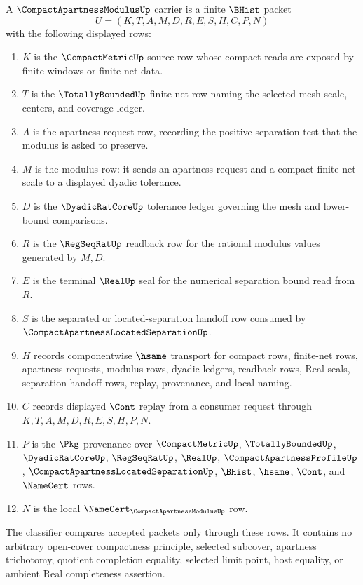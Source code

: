 \begin{definition}
\label{def:compact-apartness-modulus-carrier}
A $\CompactApartnessModulusUp$ carrier is a finite $\BHist$ packet
$$
U=(K,T,A,M,D,R,E,S,H,C,P,N)
$$
with the following displayed rows:
\begin{enumerate}
\item $K$ is the $\CompactMetricUp$ source row whose compact reads are exposed by finite windows or finite-net data.
\item $T$ is the $\TotallyBoundedUp$ finite-net row naming the selected mesh scale, centers, and coverage ledger.
\item $A$ is the apartness request row, recording the positive separation test that the modulus is asked to preserve.
\item $M$ is the modulus row: it sends an apartness request and a compact finite-net scale to a displayed dyadic tolerance.
\item $D$ is the $\DyadicRatCoreUp$ tolerance ledger governing the mesh and lower-bound comparisons.
\item $R$ is the $\RegSeqRatUp$ readback row for the rational modulus values generated by $M,D$.
\item $E$ is the terminal $\RealUp$ seal for the numerical separation bound read from $R$.
\item $S$ is the separated or located-separation handoff row consumed by $\CompactApartnessLocatedSeparationUp$.
\item $H$ records componentwise $\hsame$ transport for compact rows, finite-net rows, apartness requests, modulus rows, dyadic ledgers, readback rows, Real seals, separation handoff rows, replay, provenance, and local naming.
\item $C$ records displayed $\Cont$ replay from a consumer request through $K,T,A,M,D,R,E,S,H,P,N$.
\item $P$ is the $\Pkg$ provenance over $\CompactMetricUp$, $\TotallyBoundedUp$, $\DyadicRatCoreUp$, $\RegSeqRatUp$, $\RealUp$, $\CompactApartnessProfileUp$, $\CompactApartnessLocatedSeparationUp$, $\BHist$, $\hsame$, $\Cont$, and $\NameCert$ rows.
\item $N$ is the local $\NameCert_{\CompactApartnessModulusUp}$ row.
\end{enumerate}
The classifier compares accepted packets only through these rows. It contains no arbitrary open-cover compactness principle, selected subcover, apartness trichotomy, quotient completion equality, selected limit point, host equality, or ambient Real completeness assertion.
\end{definition}

